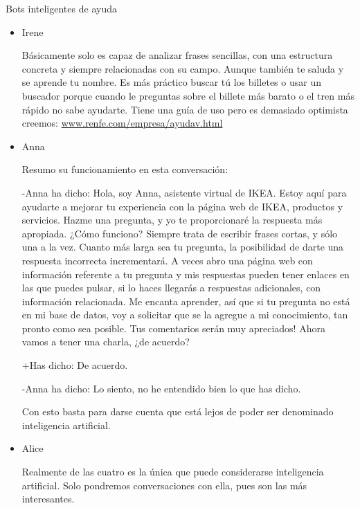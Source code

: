 \documentclass[spanish, a4paper, 12pt]{article} 	%
\begin{document}
\begin{section}{Bots inteligentes de ayuda}

	\begin{itemize}
	
	\item{Irene}
	
	Básicamente solo es capaz de analizar frases sencillas, con una estructura concreta y siempre relacionadas con su campo.
	 Aunque también te saluda y se aprende tu nombre. Es más práctico buscar tú los billetes o usar un buscador porque 
	 cuando le preguntas sobre el billete más barato o el tren más rápido no sabe ayudarte.
	 Tiene una guía de uso pero es demasiado optimista creemos: \url{www.renfe.com/empresa/ayudav.html}
	 
	\item{Anna}
	
	Resumo su funcionamiento en esta conversación:
	
	-Anna ha dicho: Hola, soy Anna, asistente virtual de IKEA. Estoy aquí para ayudarte a mejorar tu experiencia con la página 		web de IKEA, productos y servicios. Hazme una pregunta, y yo te proporcionaré la respuesta más apropiada. 
¿Cómo funciono? Siempre trata de escribir frases cortas, y sólo una a la vez. Cuanto más larga sea tu pregunta, la posibilidad de darte una respuesta incorrecta incrementará. A veces abro una página web con información referente a tu pregunta y mis respuestas pueden tener enlaces en las que puedes pulsar, si lo haces llegarás a respuestas adicionales, con información relacionada. Me encanta aprender, así que si tu pregunta no está en mi base de datos, voy a solicitar que se la agregue a mi conocimiento, tan pronto como sea posible. Tus comentarios serán muy apreciados! Ahora vamos a tener una charla, ¿de acuerdo?

	+Has dicho: De acuerdo.
	
	-Anna ha dicho: Lo siento, no he entendido bien lo que has dicho.
	
	Con esto basta para darse cuenta que está lejos de poder ser denominado inteligencia artificial.
	
	\newpage
		\item{Alice}
		
		Realmente de las cuatro es la única que puede considerarse inteligencia artificial.
		Solo pondremos conversaciones con ella, pues son las más interesantes.
		

\end{itemize}
\end{section}
\end{document}
